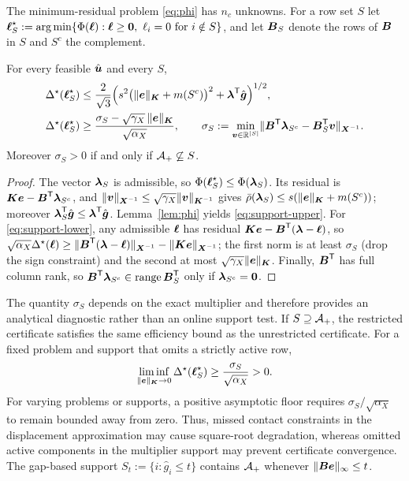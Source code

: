 The minimum-residual problem \eqref{eq:phi} has $n_c$ unknowns. For a row set $S$ let
$\boldsymbol{\ell}^{\star}_S:=\operatorname{arg\,min}\{\Phi(\boldsymbol{\ell}):\boldsymbol{\ell}\ge\boldsymbol 0,\ \ell_i=0\text{ for }i\notin S\}$, and let $\boldsymbol{B}_S$ denote the rows of $\boldsymbol{B}$ in $S$ and
$S^c$ the complement.

\begin{theorem}\label{thm:support}
For every feasible $\hat{\boldsymbol{u}}$ and every $S$,
\begin{align}
  \Delta^{\star}(\boldsymbol{\ell}^{\star}_S)&\le\frac{2}{\sqrt3}\Big(s^2\big(\lVert \boldsymbol{e} \rVert_{\boldsymbol{K}}+m(S^c)\big)^2+\boldsymbol{\lambda}^{\mathsf{T}}\hat{\boldsymbol{g}}\Big)^{1/2},\label{eq:support-upper}\\
  \Delta^{\star}(\boldsymbol{\ell}^{\star}_S)&\ge\frac{\sigma_S-\sqrt{\gamma_X}\,\lVert \boldsymbol{e} \rVert_{\boldsymbol{K}}}{\sqrt{\alpha_X}},\qquad
  \sigma_S:=\min_{\boldsymbol{v}\in\mathbb R^{|S|}}\lVert \boldsymbol{B}^{\mathsf{T}}\boldsymbol{\lambda}_{S^c}-\boldsymbol{B}_S^{\mathsf{T}}\boldsymbol{v} \rVert_{\boldsymbol{X}^{-1}}.\label{eq:support-lower}
\end{align}
Moreover $\sigma_S>0$ if and only if $\mathcal{A}_{+}\not\subseteq S$.
\end{theorem}
\begin{proof}
The vector $\boldsymbol{\lambda}_S$ is admissible, so $\Phi(\boldsymbol{\ell}^{\star}_S)\le\Phi(\boldsymbol{\lambda}_S)$. Its residual is $\boldsymbol{K}\boldsymbol{e}-\boldsymbol{B}^{\mathsf{T}}\boldsymbol{\lambda}_{S^c}$, and
$\lVert \boldsymbol{v} \rVert_{\boldsymbol{X}^{-1}}\le\sqrt{\gamma_X}\lVert \boldsymbol{v} \rVert_{\boldsymbol{K}^{-1}}$ gives $\bar{\rho}(\boldsymbol{\lambda}_S)\le s(\lVert \boldsymbol{e} \rVert_{\boldsymbol{K}}+m(S^c))$; moreover $\boldsymbol{\lambda}_S^{\mathsf{T}}\hat{\boldsymbol{g}}\le\boldsymbol{\lambda}^{\mathsf{T}}\hat{\boldsymbol{g}}$. Lemma~\ref{lem:phi} yields
\eqref{eq:support-upper}. For \eqref{eq:support-lower}, any admissible $\boldsymbol{\ell}$ has residual $\boldsymbol{K}\boldsymbol{e}-\boldsymbol{B}^{\mathsf{T}}(\boldsymbol{\lambda}-\boldsymbol{\ell})$, so
$\sqrt{\alpha_X}\Delta^{\star}(\boldsymbol{\ell})\ge\lVert \boldsymbol{B}^{\mathsf{T}}(\boldsymbol{\lambda}-\boldsymbol{\ell}) \rVert_{\boldsymbol{X}^{-1}}-\lVert \boldsymbol{K}\boldsymbol{e} \rVert_{\boldsymbol{X}^{-1}}$; the first norm is at least $\sigma_S$ (drop the sign constraint) and
the second at most $\sqrt{\gamma_X}\lVert \boldsymbol{e} \rVert_{\boldsymbol{K}}$. Finally, $\boldsymbol{B}^{\mathsf{T}}$ has full column rank, so $\boldsymbol{B}^{\mathsf{T}}\boldsymbol{\lambda}_{S^c}\in\operatorname{range}\boldsymbol{B}_S^{\mathsf{T}}$ only if
$\boldsymbol{\lambda}_{S^c}=\boldsymbol 0$.
\end{proof}

The quantity $\sigma_S$ depends on the exact multiplier and therefore provides an analytical diagnostic rather than an online support test. If
$S\supseteq\mathcal{A}_{+}$, the restricted certificate satisfies the same efficiency bound as the unrestricted certificate. For a fixed problem and
support that omits a strictly active row,
\[
  \liminf_{\lVert \boldsymbol{e} \rVert_{\boldsymbol{K}}\to0}\Delta^{\star}(\boldsymbol{\ell}^{\star}_S)\ge\frac{\sigma_S}{\sqrt{\alpha_X}}>0.
\]
For varying problems or supports, a positive asymptotic floor requires $\sigma_S/\sqrt{\alpha_X}$ to remain bounded away from zero. Thus, missed
contact constraints in the displacement approximation may cause square-root degradation, whereas omitted active components in the multiplier support
may prevent certificate convergence. The gap-based support $S_t:=\{i:\hat g_i\le t\}$ contains $\mathcal{A}_{+}$ whenever
$\lVert \boldsymbol{B}\boldsymbol{e} \rVert_\infty\le t$.
